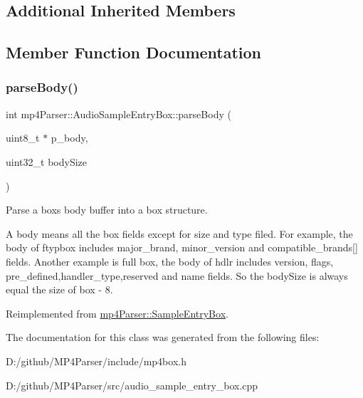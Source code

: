 \subsection*{Additional Inherited Members}


\subsection{Member Function Documentation}
\mbox{\label{classmp4_parser_1_1_audio_sample_entry_box_ab65dfb4aee59ecd374567ceafe58de4f}} 
\subsubsection{\texorpdfstring{parseBody()}{parseBody()}}
{\footnotesize\ttfamily int mp4\+Parser\+::\+Audio\+Sample\+Entry\+Box\+::parse\+Body (\begin{DoxyParamCaption}\item[{uint8\+\_\+t $\ast$}]{p\+\_\+body,  }\item[{uint32\+\_\+t}]{body\+Size }\end{DoxyParamCaption})\hspace{0.3cm}{\ttfamily [virtual]}}



Parse a box\textquotesingle{}s body buffer into a box structure. 

A body means all the box fields except for size and type filed. For example, the body of ftypbox includes major\+\_\+brand, minor\+\_\+version and compatible\+\_\+brands\mbox{[}\mbox{]} fields. Another example is full box, the body of hdlr includes version, flags, pre\+\_\+defined,handler\+\_\+type,reserved and name fields. So the body\+Size is always equal the size of box -\/ 8. 

Reimplemented from \mbox{\hyperlink{classmp4_parser_1_1_sample_entry_box_a8ff77bc115eb18deee12619ebfc0eaa6}{mp4\+Parser\+::\+Sample\+Entry\+Box}}.



The documentation for this class was generated from the following files\+:\begin{DoxyCompactItemize}
\item 
D\+:/github/\+M\+P4\+Parser/include/mp4box.\+h\item 
D\+:/github/\+M\+P4\+Parser/src/audio\+\_\+sample\+\_\+entry\+\_\+box.\+cpp\end{DoxyCompactItemize}

